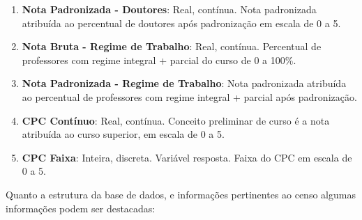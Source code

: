 \begin{enumerate}
	\item \textbf{Nota Padronizada - Doutores}: Real, contínua. Nota padronizada atribuída ao percentual de doutores após padronização em escala de 0 a 5.
	\item \textbf{Nota Bruta - Regime de Trabalho}: Real, contínua. Percentual de professores com regime integral + parcial do curso de 0 a 100\%.
	\item \textbf{Nota Padronizada - Regime de Trabalho}: Nota padronizada atribuída ao percentual de professores com regime integral + parcial após padronização.
	\item \textbf{CPC Contínuo}: Real, contínua. Conceito preliminar de curso é a nota atribuída ao curso superior, em escala de 0 a 5.
	\item \textbf{CPC Faixa}: Inteira, discreta. Variável resposta. Faixa do CPC em escala de 0 a 5.
	\end{enumerate}

	Quanto a estrutura da base de dados, e informações pertinentes ao censo algumas informações podem ser destacadas:


